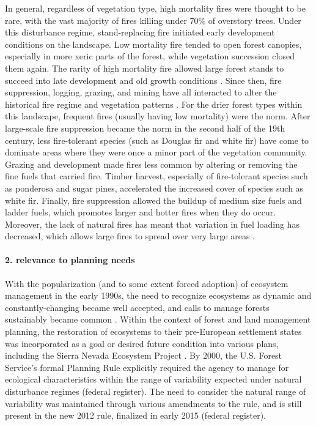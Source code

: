 \documentclass[12pt]{article}
\begin{document}
\begin{spacing}{1}
In general, regardless of vegetation type, high mortality fires were thought to be rare, with the vast majority of fires killing under 70\% of overstory trees. Under this disturbance regime, stand-replacing fire initiated early development conditions on the landscape. Low mortality fire tended to open forest canopies, especially in more xeric parts of the forest, while vegetation succession closed them again. The rarity of high mortality fire allowed large forest stands to succeed into late development and old growth conditions \citep{SNEP1996,Mallek2013,Safford2014,SNEP1996a}. Since then, fire suppression, logging, grazing, and mining have all interacted to alter the historical fire regime and vegetation patterns \citep{Stephens2015,Knapp2013}. For the drier forest types within this landscape, frequent fires (usually having low mortality) were the norm. After large-scale fire suppression became the norm in the second half of the 19th century, less fire-tolerant species (such as Douglas fir and white fir) have come to dominate areas where they were once a minor part of the vegetation community. Grazing and development made fires less common by altering or removing the fine fuels that carried fire. Timber harvest, especially of fire-tolerant species such as ponderosa and sugar pines, accelerated the increased cover of species such as white fir. Finally, fire suppression allowed the buildup of medium size fuels and ladder fuels, which promotes larger and hotter fires when they do occur. Moreover, the lack of natural fires has meant that variation in fuel loading has decreased, which allows large fires to spread over very large areas \citep{Hessburg2005}.

\paragraph{2. relevance to planning needs}
With the popularization (and to some extent forced adoption) of ecosystem management in the early 1990s, the need to recognize ecosystems as dynamic and constantly-changing became well accepted, and calls to manage forests sustainably became common \citep{Christensen1996}. Within the context of forest and land management planning, the restoration of ecosystems to their pre-European settlement states was incorporated as a goal or desired future condition into various plans, including the Sierra Nevada Ecosystem Project \cite{SNEP1996a}. By 2000, the U.S. Forest Service's formal Planning Rule explicitly required the agency to manage for ecological characteristics within the range of variability expected under natural disturbance regimes (federal register). The need to consider the natural range of variability was maintained through various amendments to the rule, and is still present in the new 2012 rule, finalized in early 2015 (federal register). 



\end{spacing}
\end{document}
